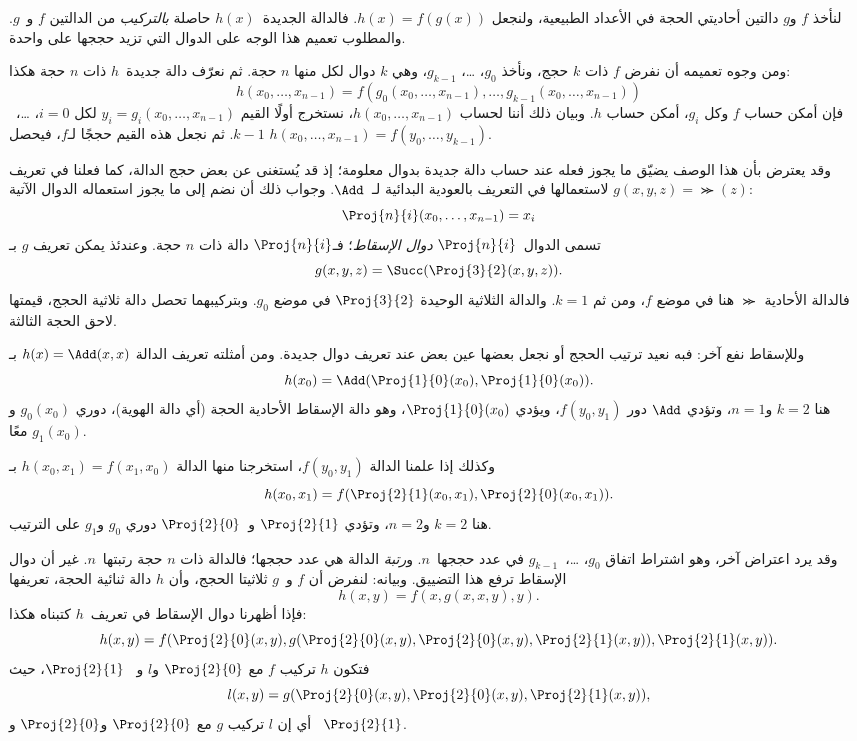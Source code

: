 \documentclass[../../../include/open-logic-section]{subfiles}
\begin{document}

لنأخذ $f$ و$g$ دالتين أحاديتي الحجة في الأعداد الطبيعية، ولنجعل
$h(x)=f(g(x))$. فالدالة الجديدة~$h(x)$ حاصلة
\emph{بالتركيب} من الدالتين $f$ و~$g$. والمطلوب تعميم هذا الوجه على الدوال
التي تزيد حججها على واحدة.

ومن وجوه تعميمه أن نفرض $f$ ذات $k$ حجج، ونأخذ $g_0$، …،
$g_{k-1}$، وهي $k$ دوال لكل منها $n$ حجة. ثم نعرّف دالة
جديدة~$h$ ذات $n$ حجة هكذا:
\[
h(x_0, \dots, x_{n-1}) =
f(g_0(x_0, \dots, x_{n-1}), \dots, g_{k-1}(x_0, \dots, x_{n-1}))
\]
فإن أمكن حساب $f$ وكل $g_i$، أمكن حساب $h$. وبيان ذلك أننا لحساب
$h(x_0,\dots,x_{n-1})$، نستخرج أولًا القيم
$y_i=g_i(x_0,\dots,x_{n-1})$ لكل $i=0$، …،~$k-1$. ثم نجعل هذه
القيم حججًا لـ$f$، فيحصل
$h(x_0,\dots,x_{n-1})=f(y_0,\dots,y_{k-1})$.

وقد يعترض بأن هذا الوصف يضيّق ما يجوز فعله عند حساب دالة جديدة بدوال
معلومة؛ إذ قد يُستغنى عن بعض حجج الدالة، كما فعلنا في تعريف
$g(x,y,z)=\Succ(z)$ لاستعمالها في التعريف بالعودية البدائية لـ~$\Add$.
وجواب ذلك أن نضم إلى ما يجوز استعماله الدوال الآتية:
\[
\Proj{n}{i}(x_0, \dots, x_{n-1}) = x_i
\]
تسمى الدوال~$\Proj{n}{i}$ \emph{دوال الإسقاط}؛ فـ$\Proj{n}{i}$ دالة
ذات $n$ حجة. وعندئذ يمكن تعريف $g$ بـ
\[
g(x, y, z) = \Succ(\Proj{3}{2}(x, y, z)).
\]
فالدالة الأحادية $\Succ$ هنا في موضع $f$، ومن ثم $k=1$. والدالة
الثلاثية الوحيدة $\Proj{3}{2}$ في موضع $g_0$. وبتركيبهما تحصل دالة
ثلاثية الحجج، قيمتها لاحق الحجة الثالثة.

وللإسقاط نفع آخر: فبه نعيد ترتيب الحجج أو نجعل بعضها عين بعض عند
تعريف دوال جديدة. ومن أمثلته تعريف الدالة $h(x)=\Add(x,x)$ بـ
\[
h(x_0) = \Add(\Proj{1}{0}(x_0),\Proj{1}{0}(x_0)).
\]
هنا $k=2$ و$n=1$، وتؤدي $\Add$ دور $f(y_0,y_1)$، ويؤدي
$\Proj{1}{0}(x_0)$، وهو دالة الإسقاط الأحادية الحجة (أي دالة الهوية)،
دوري $g_0(x_0)$ و$g_1(x_0)$ معًا.

وكذلك إذا علمنا الدالة $f(y_0,y_1)$، استخرجنا منها الدالة
$h(x_0,x_1)=f(x_1,x_0)$ بـ
\[
h(x_0, x_1) = f(\Proj{2}{1}(x_0, x_1),\Proj{2}{0}(x_0, x_1)).
\]
هنا $k=2$ و$n=2$، وتؤدي $\Proj{2}{1}$ و~$\Proj{2}{0}$ دوري
$g_0$ و$g_1$ على الترتيب.

وقد يرد اعتراض آخر، وهو اشتراط اتفاق $g_0$، …،~$g_{k-1}$ في عدد
حججها~$n$. و\emph{رتبة} الدالة هي عدد حججها؛ فالدالة ذات
$n$ حجة رتبتها~$n$. غير أن دوال الإسقاط ترفع هذا التضييق.
وبيانه: لنفرض أن $f$ و~$g$ ثلاثيتا الحجج، وأن $h$ دالة ثنائية
الحجة، تعريفها
\[
h(x,y) = f(x,g(x,x,y),y).
\]
فإذا أظهرنا دوال الإسقاط في تعريف~$h$ كتبناه هكذا:
\[
h(x,y) = f(\Proj{2}{0}(x,y), g(\Proj{2}{0}(x,y), \Proj{2}{0}(x,y),
\Proj{2}{1}(x,y)), \Proj{2}{1}(x,y)).
\]
فتكون $h$ تركيب $f$ مع $\Proj{2}{0}$ و$l$ و
~$\Proj{2}{1}$، حيث
\[
l(x,y) = g(\Proj{2}{0}(x,y),\Proj{2}{0}(x,y),\Proj{2}{1}(x,y)),
\]
أي إن $l$ تركيب $g$ مع $\Proj{2}{0}$ و$\Proj{2}{0}$ و
~$\Proj{2}{1}$.
\end{document}
